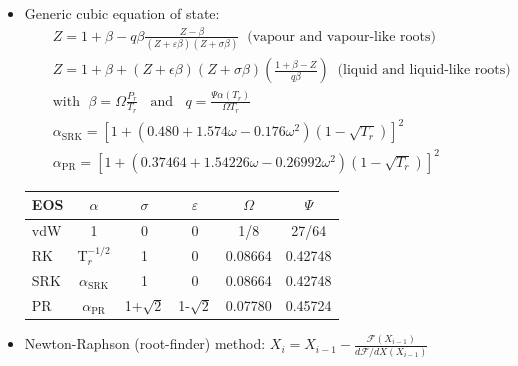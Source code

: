 \documentclass[calculator,fluidstables,datasheet,sample]{exam}
\newcommand{\frc}{\displaystyle\frac}
\begin{document}
\clearpage
\begin{itemize}
\item Generic cubic equation of state:
\begin{eqnarray}
&& Z= 1 + \beta - q\beta \frc{Z - \beta} {\left(Z+\varepsilon\beta\right)\left(Z+\sigma\beta\right)}  \;\;\text{(vapour and vapour-like roots)}\nonumber\\
&& Z= 1 + \beta + \left(Z + \epsilon\beta\right)\left(Z+\sigma\beta\right)\left(\frc{1+\beta-Z}{q\beta}\right)  \;\;\text{(liquid and liquid-like roots)}\nonumber\\
&& \text{with }\; \beta=\Omega\frc{P_{r}}{T_{r}} \;\;\text{ and } \;\; q=\frc{\Psi\alpha\left(T_{r}\right)}{\Omega T_{r}}  \nonumber \\
&&\alpha_{\text{SRK}} = \left[ 1 + \left( 0.480 + 1.574 \omega - 0.176\omega^{2}\right)\left(1-\sqrt{T_{r}}\right)\right]^{2}  \nonumber \\
&&\alpha_{\text{PR}} = \left[ 1 + \left( 0.37464 + 1.54226 \omega - 0.26992\omega^{2}\right)\left(1-\sqrt{T_{r}}\right)\right]^{2} \nonumber
\end{eqnarray} 
    \begin{center}
       \begin{tabular}{| l | c c c c c| }
       \hline
          {\bf EOS}  & {\bf $\alpha$} & {\bf $\sigma$}  & {\bf $\varepsilon$} & {\bf $\Omega$} & {\bf $\Psi$ } \\
       \hline
            vdW      & 1              & 0               & 0                  & 1/8            & 27/64          \\
            RK       & T$_{r}^{-1/2}$  & 1                & 0                  & 0.08664       & 0.42748        \\
           SRK       &$\alpha_{\text{SRK}}$& 1            & 0                   & 0.08664       & 0.42748        \\
            PR       &$\alpha_{\text{PR}}$& 1+$\sqrt{2}$   & 1-$\sqrt{2}$        & 0.07780        & 0.45724  \\
       \hline
       \end{tabular}
    \end{center}

\item Newton-Raphson (root-finder) method: $X_{i} = X_{i-1} - \frc{\mathcal{F}\left(X_{i-1}\right)}{d\mathcal{F}/dX\left(X_{i-1}\right)}$


\end{itemize}
\end{document}
